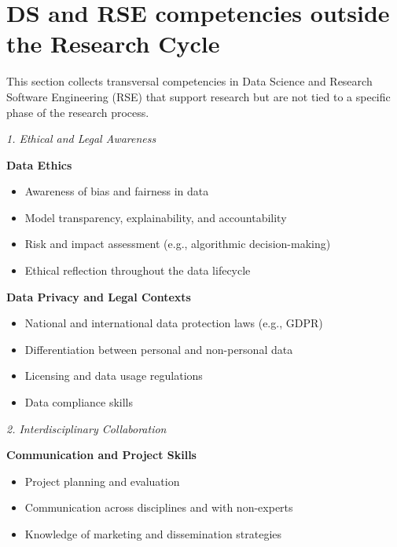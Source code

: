\documentclass[
        english,biblatex
    ]{lni}
\providecommand{\tightlist}{%
    \setlength{\itemsep}{0pt}\setlength{\parskip}{0pt}}
\begin{document}
    \section{DS and RSE competencies outside the Research
    Cycle}\label{ds-and-rse-competencies-outside-the-research-cycle}

    This section collects transversal competencies in Data Science and
    Research Software Engineering (RSE) that support research but are
    not tied to a specific phase of the research process.

    \emph{1. Ethical and Legal Awareness}

    \textbf{Data Ethics}

    \begin{itemize}
    \tightlist
    \item
      Awareness of bias and fairness in data
    \item
      Model transparency, explainability, and accountability
    \item
      Risk and impact assessment (e.g., algorithmic decision-making)
    \item
      Ethical reflection throughout the data lifecycle
    \end{itemize}

    \textbf{Data Privacy and Legal Contexts}

    \begin{itemize}
    \tightlist
    \item
      National and international data protection laws (e.g., GDPR)
    \item
      Differentiation between personal and non-personal data
    \item
      Licensing and data usage regulations
    \item
      Data compliance skills
    \end{itemize}

    \emph{2. Interdisciplinary Collaboration}

    \textbf{Communication and Project Skills}

    \begin{itemize}
    \tightlist
    \item
      Project planning and evaluation
    \item
      Communication across disciplines and with non-experts
    \item
      Knowledge of marketing and dissemination strategies
    \end{itemize}
\end{document}
